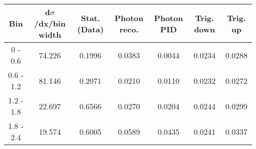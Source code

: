 \documentclass{article}
\begin{document}
\begin{table}[H]
\begin{adjustbox}{width=1.1\textwidth}
\begin{tabular}{|c|c|c|c|c|c|c|}
\hline
Bin & d$\sigma$/dx/bin width & Stat. (Data) & Photon reco. & Photon PID & Trig. down & Trig. up \\
\hline
0 - 0.6 & 74.226 & 0.1996 & 0.0383 & 0.0044 & 0.0234 & 0.0288 \\
\hline
0.6 - 1.2 & 81.146 & 0.2071 & 0.0210 & 0.0110 & 0.0232 & 0.0272 \\
\hline
1.2 - 1.8 & 22.697 & 0.6566 & 0.0270 & 0.0204 & 0.0244 & 0.0299 \\
\hline
1.8 - 2.4 & 19.574 & 0.6005 & 0.0589 & 0.0435 & 0.0241 & 0.0337 \\
\hline
\end{tabular}
\end{adjustbox}
\end{table}
\end{document}
